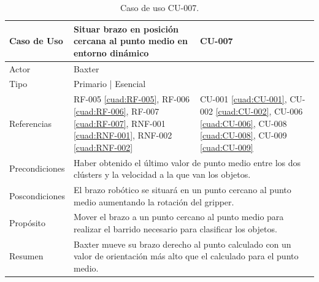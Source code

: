 \begin{table}[H]
	\centering
	\begin{tabular}{|p{2.5cm} | p{6cm} | p{5cm} |}
		\hline
		\textbf{Caso de Uso} & Situar brazo en posición cercana al punto medio en entorno dinámico & \textbf{CU-007} \\
		\hline 
		Actor & \multicolumn{2}{|l|}{Baxter} \\
		\hline
		Tipo & \multicolumn{2}{|l|}{Primario | Esencial} \\
		\hline
		Referencias & RF-005 \ref{cuad:RF-005}, RF-006 \ref{cuad:RF-006}, RF-007 \ref{cuad:RF-007}, RNF-001 \ref{cuad:RNF-001}, RNF-002 \ref{cuad:RNF-002} & CU-001 \ref{cuad:CU-001}, CU-002 \ref{cuad:CU-002}, CU-006 \ref{cuad:CU-006}, CU-008 \ref{cuad:CU-008}, CU-009 \ref{cuad:CU-009} \\
		\hline
		Precondiciones & \multicolumn{2}{|l|}{\parbox{30em}{Haber obtenido el último valor de punto medio entre los dos clústers y la velocidad a la que van los objetos.}} \\
		\hline
		Poscondiciones & \multicolumn{2}{|l|}{\parbox{30em}{El brazo robótico se situará en un punto cercano al punto medio aumentando la rotación del gripper.}} \\
		\hline
		Propósito & \multicolumn{2}{|l|}{\parbox{30em}{Mover el brazo a un punto cercano al punto medio para realizar el barrido necesario para clasificar los objetos.}} \\
		\hline
		Resumen & \multicolumn{2}{|l|}{\parbox{30em}{Baxter mueve su brazo derecho al punto calculado con un valor de orientación más alto que el calculado para el punto medio.}} \\
		\hline
		
	\end{tabular}
	\caption{Caso de uso CU-007.}
	\label{cuad:CU-007}
\end{table}

